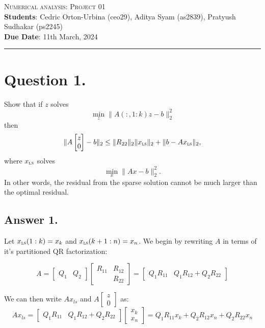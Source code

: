 \documentclass[12pt]{article}
\newcommand{\ls}{\textsc{ls}}
\begin{document}
\noindent
\textsc{\Large Numerical analysis: Project 01} \\ 
\noindent \textbf{Students}:
Cedric Orton-Urbina (ceo29),
Aditya Syam (as2839),
Pratyush Sudhakar (ps2245)
\\
\noindent
\textbf{Due Date}: 11th March, 2024
\\

\hrule

\section*{Question 1.}
Show that if $z$ solves 
\[
    \min_{z} \|A(:,1:k)z - b\|_2^2 
\]
then 
\[
    \|A\begin{bmatrix}z \\ 0\end{bmatrix}-b\|_2 \leq \|R_{22}\|_2\|x_{\ls}\|_2 + \|b-Ax_{\ls}\|_2,
\]
where $x_{\ls}$ solves 
\[
    \min_{x} \|Ax - b\|_2^2. 
\]
In other words, the residual from the sparse solution cannot be much larger than the optimal residual. 

\subsection*{Answer 1.}

Let $x_{\ls}(1:k) = x_k$ and $x_{\ls}(k+1:n) = x_n$. We begin by rewriting $A$ in terms of it's partitioned QR factorization:

$$A = \begin{bmatrix}
        Q_1 & Q_2
    \end{bmatrix}
    \begin{bmatrix}
        R_{11} & R_{12} \\
               & R_{22}
    \end{bmatrix} =  \begin{bmatrix}
        Q_1R_{11} & Q_1R_{12}+Q_2R_{22}
    \end{bmatrix}$$

We can then write $Ax_{ls}$ and $A\begin{bmatrix}z \\ 0\end{bmatrix}$ as: \\

$$Ax_{ls} =  \begin{bmatrix}
        Q_1R_{11} & Q_1R_{12}+Q_2R_{22}
    \end{bmatrix} \begin{bmatrix}
        x_k \\
        x_n
    \end{bmatrix} = Q_1R_{11}x_k + Q_2R_{12}x_n + Q_2R_{22}x_n$$ \\
\end{document}
